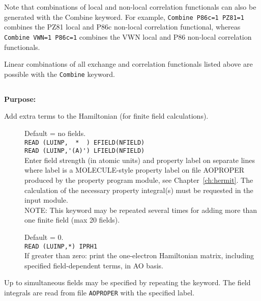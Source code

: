 Note that combinations of local and non-local correlation functionals
can also be generated with the Combine keyword. For example,
\verb|Combine P86c=1 PZ81=1| combines the PZ81 local and P86c non-local 
correlation functional, whereas \verb|Combine VWN=1 P86c=1| 
combines the VWN local and P86 non-local correlation functionals.


Linear combinations of all exchange and correlation functionals listed above
are possible with the \verb|Combine| keyword.


\pagebreak[3]
\subsection{\label{ref-haminp}}

{\bf Purpose:}

Add extra terms to the Hamiltonian (for finite field calculations).

\begin{description}
\item[]
  Default = no fields. \\
  \verb"READ (LUINP,  *  ) EFIELD(NFIELD)" \\
  \verb"READ (LUINP,'(A)') LFIELD(NFIELD)" \\
  Enter field strength (in atomic units) and property label on separate lines
  where label is a MOLE\-CULE-style property label on file AOPROPER
  produced by the property program module, see Chapter~\ref{ch:hermit}.
  The calculation of the necessary property integral(s) must be requested
  in the  input module. \\
  NOTE: This keyword may be repeated several times for adding more than
  one finite field (max 20 fields).

\item[]
  Default = 0.\\
  \verb"READ (LUINP,*) IPRH1" \\
  If greater than zero:
  print the one-electron Hamiltonian matrix, including
  specified field-dependent terms, in AO basis.
\end{description}


Up to \mxfelt simultaneous fields may be specified by repeating the
 keyword.
The field integrals are read from file \verb|AOPROPER| with the specified label.

\pagebreak[3]
\subsection{\label{ref-mp2inp}}

